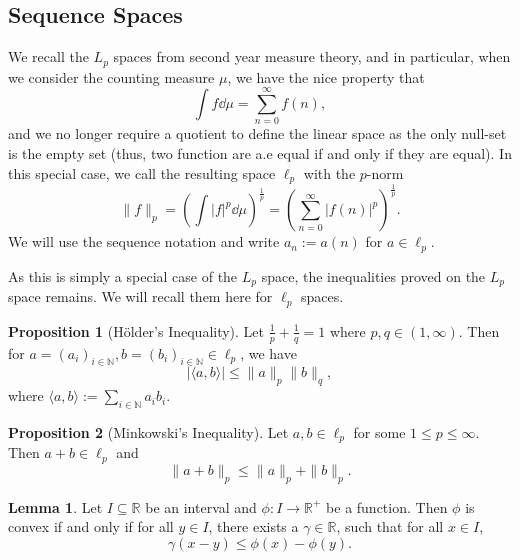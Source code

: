 \documentclass[]{article}
\theoremstyle{definition}
\theoremstyle{definition}
\newtheorem{lemma}{Lemma}[section]
\newtheorem{proposition}{Proposition}[section]
\begin{document}
\subsection{Sequence Spaces}

We recall the \(L_p\) spaces from second year measure theory, and in particular, 
when we consider the counting measure \(\mu\), we have the nice property that 
\[\int f \dd \mu = \sum_{n = 0}^\infty f(n),\]
and we no longer require a quotient to define the linear space as the only 
null-set is the empty set (thus, two function are a.e equal if and only if they 
are equal). In this special case, we call the resulting space \(\ell_p\) with 
the \(p\)-norm 
\[\|f\|_p = \left(\int |f|^p \dd \mu\right)^{\frac{1}{p}} = 
  \left(\sum_{n = 0}^\infty |f(n)|^p \right)^{\frac{1}{p}}.\]
We will use the sequence notation and write \(a_n := a(n)\) for \(a \in \ell_p\).

As this is simply a special case of the \(L_p\) space, the inequalities proved 
on the \(L_p\) space remains. We will recall them here for \(\ell_p\) spaces.

\begin{proposition}[Hölder's Inequality]
  Let \(\frac{1}{p} + \frac{1}{q} = 1\) where \(p, q \in (1, \infty)\). Then 
  for \(a = (a_i)_{i \in \mathbb{N}}, b = (b_i)_{i \in \mathbb{N}} \in \ell_p\), 
  we have 
  \[|\langle a, b\rangle| \le \|a\|_p \|b\|_q,\] 
  where \(\langle a, b\rangle := \sum_{i \in \mathbb{N}} a_i b_i\).
\end{proposition}

\begin{proposition}[Minkowski's Inequality]
  Let \(a, b \in \ell_p\) for some \(1 \le p \le \infty\). 
  Then \(a + b \in \ell_p\) and
  \[\|a + b\|_p \le \|a\|_p + \|b\|_p.\]
\end{proposition}

\begin{lemma}
  Let \(I \subseteq \mathbb{R}\) be an interval and 
  \(\phi : I \to \mathbb{R}^+\) be a function. 
  Then \(\phi\) is convex if and only if for all \(y \in I\), there exists 
  a \(\gamma \in \mathbb{R}\), such that for all \(x \in I\),
  \[\gamma(x - y) \le \phi(x) - \phi(y).\]
\end{lemma}
\end{document}
